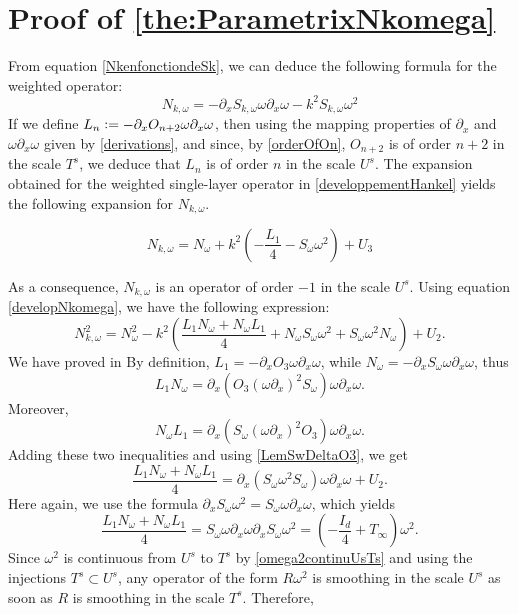 \documentclass[a4paper]{article}
\begin{document}
\section{Proof of \autoref{the:ParametrixNkomega}}
\label{ParametrixNkomega}
From equation \eqref{NkenfonctiondeSk}, we can deduce the following formula for the weighted operator:
\begin{equation}
\label{developNkomega}
N_{k,\omega} = - \partial_x S_{k,\omega} \omega \partial_x \omega - k^2 S_{k,\omega} \omega^2
\end{equation}
If we define $L_n \mathrel{\mathop:}= - \partial_x O_{n+2} \omega \partial_x \omega$, then using the mapping properties of $\partial_x$ and $\omega\partial_x\omega$ given by \autoref{derivations}, and since, by \autoref{orderOfOn}, $O_{n+2}$ is of order $n+2$ in the scale $T^s$, we deduce that $L_n$ is of order $n$ in the scale $U^s$. 
The expansion obtained for the weighted single-layer operator in \autoref{developpementHankel} yields the following expansion for $N_{k,\omega}$. 
\begin{Lem}
	\[N_{k,\omega} = N_\omega + k^2 \left( -\frac{L_1}{4}- S_\omega \omega^2 \right) + U_3\]
\end{Lem}
\noindent As a consequence, $N_{k,\omega}$ is an operator of order $-1$ in the scale $U^s$. 
Using equation \eqref{developNkomega}, we have the following expression:
\[N_{k,\omega}^2 = N_\omega^2 - k^2\left( \frac{L_1 N_\omega + N_\omega L_1}{4} + N_\omega S_\omega \omega^2 + S_\omega \omega^2 N_\omega\right) + U_2.\]
We have proved in
By definition, $L_1 = -\partial_x O_3 \omega \partial_x \omega$, while $N_\omega = - \partial_x S_\omega \omega \partial_x \omega$, thus
\[L_1 N_\omega = \partial_x (O_3 (\omega \partial_x)^2 S_\omega ) \omega \partial_x \omega.\]
Moreover, 
\[N_\omega L_1 =  \partial_x (S_\omega (\omega \partial_x)^2 O_3  ) \omega \partial_x \omega.\]
Adding these two inequalities and using \autoref{LemSwDeltaO3}, we get 
\[\frac{L_1 N_\omega + N_\omega L_1}{4} =\partial_x ( S_\omega \omega^2 S_\omega ) \omega \partial_x \omega + U_2.\]
Here again, we use the formula $\partial_x S_\omega \omega^2 = S_\omega \omega \partial_x \omega$, which yields
\[\frac{L_1 N_\omega + N_\omega L_1}{4} = S_\omega \omega \partial_x \omega \partial_x S_\omega \omega^2 = \left(-\frac{I_d}{4} + T_\infty\right)\omega^2 .\]
Since $\omega^2$ is continuous from $U^s$ to $T^s$ by \autoref{omega2continuUsTs} and using the injections $T^s\subset U^s$, any operator of the form $R \omega^2$ is smoothing in the scale $U^s$ as soon as $R$ is smoothing in the scale $T^s$. Therefore, 
\end{document}
